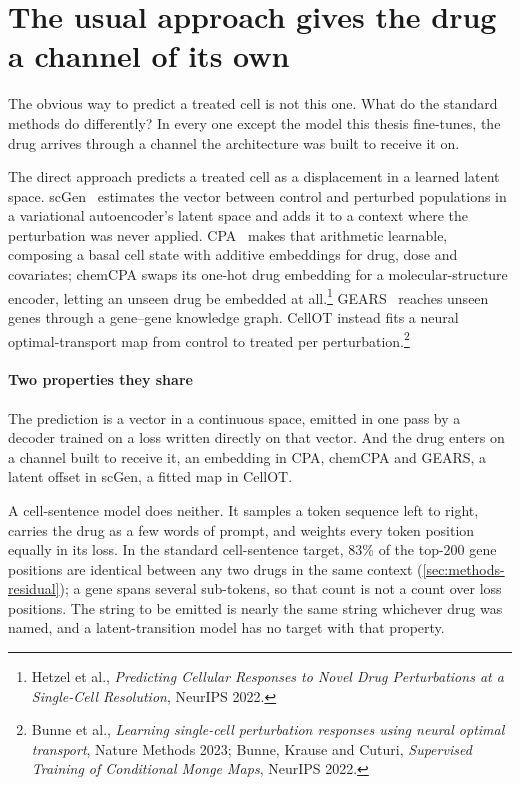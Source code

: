 \section{The usual approach gives the drug a channel of its own}
\label{sec:lit-chem}
\framedecl{-}

\begin{question}
The obvious way to predict a treated cell is not this one. What do the standard
methods do differently? In every one except the model this thesis fine-tunes, the
drug arrives through a channel the architecture was built to receive it on.
\end{question}

\noindent
The direct approach predicts a treated cell as a displacement in a learned
latent space. scGen~\cite{scgen} estimates the vector between control and
perturbed populations in a variational autoencoder's latent space and adds it to
a context where the perturbation was never applied. CPA~\cite{cpa} makes that
arithmetic learnable, composing a basal cell state with additive embeddings for
drug, dose and covariates; chemCPA swaps its one-hot drug embedding for a
molecular-structure encoder, letting an unseen drug be embedded at
all.\footnote{Hetzel et al., \emph{Predicting Cellular Responses to Novel Drug
Perturbations at a Single-Cell Resolution}, NeurIPS 2022.} GEARS~\cite{gears}
reaches unseen genes through a gene--gene knowledge graph. CellOT instead fits a
neural optimal-transport map from control to treated per perturbation.\footnote{
Bunne et al., \emph{Learning single-cell perturbation responses using neural
optimal transport}, Nature Methods 2023; Bunne, Krause and Cuturi,
\emph{Supervised Training of Conditional Monge Maps}, NeurIPS 2022.}

\paragraph{Two properties they share} The prediction is a vector in a continuous
space, emitted in one pass by a decoder trained on a loss written directly on
that vector. And the drug enters on a channel built to receive it, an embedding
in CPA, chemCPA and GEARS, a latent offset in scGen, a fitted map in CellOT.

A cell-sentence model does neither. It samples a token sequence left to right,
carries the drug as a few words of prompt, and weights every token position
equally in its loss. In the standard cell-sentence target, $83\%$ of the
top-$200$ gene positions are identical between any two drugs in the same context
(\cref{sec:methods-residual}); a gene spans several sub-tokens, so that count is
not a count over loss positions. The string to be emitted is nearly the same string
whichever drug was named, and a latent-transition model has no target with that
property.


